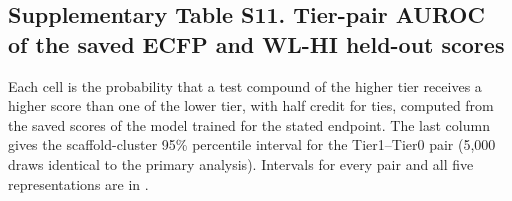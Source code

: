 \subsection*{Supplementary Table S11. Tier-pair AUROC of the saved ECFP and WL-HI held-out scores}

Each cell is the probability that a test compound of the higher tier receives a higher score than one of the lower tier, with half credit for ties, computed from the saved scores of the model trained for the stated endpoint. The last column gives the scaffold-cluster 95\% percentile interval for the Tier1--Tier0 pair (5,000 draws identical to the primary analysis). Intervals for every pair and all five representations are in .

\begingroup\footnotesize\setlength{\tabcolsep}{3pt}

